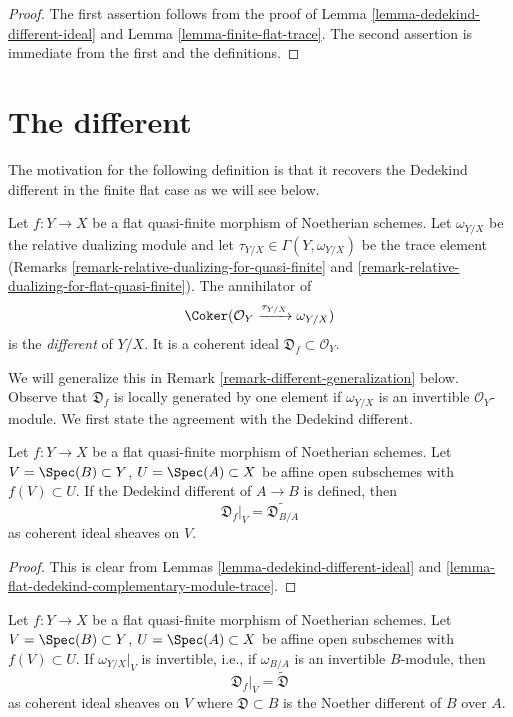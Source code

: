 \begin{proof}
The first assertion
follows from the proof of Lemma \ref{lemma-dedekind-different-ideal}
and Lemma \ref{lemma-finite-flat-trace}.
The second assertion is immediate from the first and the
definitions.
\end{proof}



\section{The different}
\label{section-different}

\noindent
The motivation for the following definition is that it recovers the
Dedekind different in the finite flat case as we will see below.

\begin{definition}
\label{definition-different}
Let $f : Y \to X$ be a flat quasi-finite morphism of Noetherian schemes.
Let $\omega_{Y/X}$ be the relative dualizing module and let
$\tau_{Y/X} \in \Gamma(Y, \omega_{Y/X})$ be the trace element
(Remarks \ref{remark-relative-dualizing-for-quasi-finite} and
\ref{remark-relative-dualizing-for-flat-quasi-finite}).
The annihilator of
$$
\Coker(\mathcal{O}_Y \xrightarrow{\tau_{Y/X}} \omega_{Y/X})
$$
is the {\it different} of $Y/X$. It is a coherent ideal
$\mathfrak{D}_f \subset \mathcal{O}_Y$.
\end{definition}

\noindent
We will generalize this in Remark \ref{remark-different-generalization} below.
Observe that $\mathfrak{D}_f$ is locally generated by one element if
$\omega_{Y/X}$ is an invertible $\mathcal{O}_Y$-module.
We first state the agreement with the Dedekind different.

\begin{lemma}
\label{lemma-flat-agree-dedekind}
Let $f : Y \to X$ be a flat quasi-finite morphism of Noetherian schemes.
Let $V = \Spec(B) \subset Y$, $U = \Spec(A) \subset X$
be affine open subschemes with $f(V) \subset U$.
If the Dedekind different of $A \to B$ is defined, then
$$
\mathfrak{D}_f|_V = \widetilde{\mathfrak{D}_{B/A}}
$$
as coherent ideal sheaves on $V$.
\end{lemma}

\begin{proof}
This is clear from Lemmas \ref{lemma-dedekind-different-ideal} and
\ref{lemma-flat-dedekind-complementary-module-trace}.
\end{proof}

\begin{lemma}
\label{lemma-flat-gorenstein-agree-noether}
Let $f : Y \to X$ be a flat quasi-finite morphism of Noetherian schemes.
Let $V = \Spec(B) \subset Y$, $U = \Spec(A) \subset X$
be affine open subschemes with $f(V) \subset U$.
If $\omega_{Y/X}|_V$ is invertible, i.e., if $\omega_{B/A}$
is an invertible $B$-module, then
$$
\mathfrak{D}_f|_V = \widetilde{\mathfrak{D}}
$$
as coherent ideal sheaves on $V$ where
$\mathfrak{D} \subset B$ is the Noether different of $B$ over $A$.
\end{lemma}


